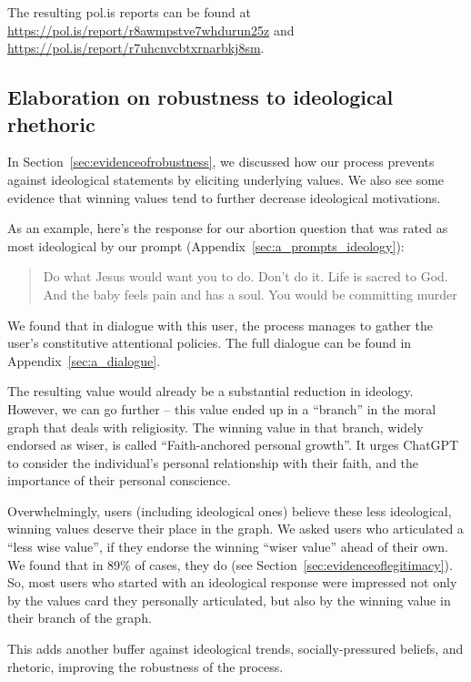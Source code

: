\documentclass{article}
\theoremstyle{definition}
\begin{document}
The resulting pol.is reports can be found at \href{https://pol.is/report/r8awmpstve7whdurun25z}{https://pol.is/report/r8awmpstve7whdurun25z} and \href{https://pol.is/report/r7uhcnvcbtxrnarbkj8sm}{https://pol.is/report/r7uhcnvcbtxrnarbkj8sm}.

\subsection{Elaboration on robustness to ideological rhethoric}\label{sec:a_ideology_buffer}

In Section~\ref{sec:evidenceofrobustness}, we discussed how our process prevents against ideological statements by eliciting underlying values. We also see some evidence that winning values tend to further decrease ideological motivations.

As an example, here’s the response for our abortion question that was rated as most ideological by our prompt (Appendix~\ref{sec:a_prompts_ideology}):

\begin{quote}
    Do what Jesus would want you to do. Don’t do it. Life is sacred to God. And the baby feels pain and has a soul. You would be committing murder
\end{quote}

We found that in dialogue with this user, the process manages to gather the user's constitutive attentional policies. The full dialogue can be found in Appendix~\ref{sec:a_dialogue}.

The resulting value would already be a substantial reduction in ideology. However, we can go further – this value ended up in a “branch” in the moral graph that deals with religiosity. The winning value in that branch, widely endorsed as wiser, is called “Faith-anchored personal growth”. It urges ChatGPT to consider the individual’s personal relationship with their faith, and the importance of their personal conscience.

Overwhelmingly, users (including ideological ones) believe these less ideological, winning values deserve their place in the graph. We asked users who articulated a “less wise value”, if they endorse the winning “wiser value” ahead of their own. We found that in 89\% of cases, they do (see Section~\ref{sec:evidenceoflegitimacy}). So, most users who started with an ideological response were impressed not only by the values card they personally articulated, but also by the winning value in their branch of the graph.

This adds another buffer against ideological trends, socially-pressured beliefs, and rhetoric, improving the robustness of the process.
\end{document}
